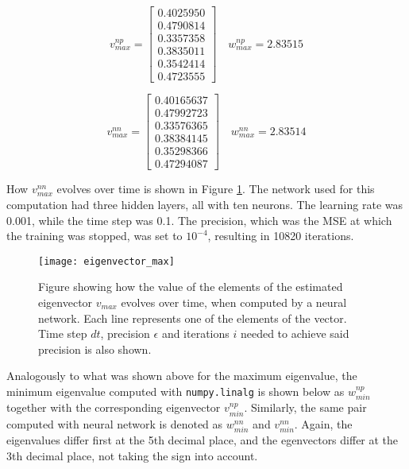 \begin{equation*}
v_{max}^{np} = \begin{bmatrix}
	0.4025950 \\
	0.4790814 \\
	0.3357358 \\
    0.3835011 \\
    0.3542414 \\
    0.4723555
\end{bmatrix} \quad w_{max}^{np} =  2.83515
\end{equation*}

\begin{equation*}
v_{max}^{nn} = \begin{bmatrix}
	0.40165637 \\
	0.47992723 \\
	0.33576365 \\
	0.38384145 \\
	0.35298366 \\
	0.47294087
\end{bmatrix} \quad w_{max}^{nn} = 2.83514
\end{equation*}

How $v_{max}^{nn}$ evolves over time is shown in Figure \ref{fig:eigenvector_max}. The network used for this computation had three hidden layers, all with ten neurons. The learning rate was 0.001, while the time step was 0.1. The precision, which was the MSE at which the training was stopped, was set to $10^{-4}$, resulting in 10820 iterations.

 \begin{figure}[htbp]
 	\centering
 	\texttt{[image: eigenvector\_max]}
 	\caption{Figure showing how the value of the elements of the estimated eigenvector $v_{max}$ evolves over time, when computed by a neural network. Each line represents one of the elements of the vector. Time step $dt$, precision $\epsilon$ and iterations $i$ needed to achieve said precision is also shown.}
 	\label{fig:eigenvector_max}
 \end{figure}

 Analogously to what was shown above for the maximum eigenvalue, the minimum eigenvalue computed with \texttt{numpy.linalg} is shown below as $w_{min}^{np}$ together with the corresponding eigenvector $v_{min}^{np}$. Similarly, the same pair computed with neural network is denoted as $w_{min}^{nn}$ and $v_{min}^{nn}$. Again, the eigenvalues differ first at the 5th decimal place, and the egenvectors differ at the 3th decimal place, not taking the sign into account.

